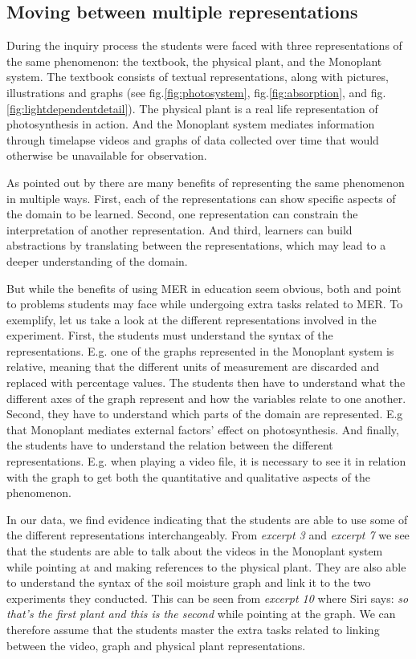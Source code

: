 \subsection{Moving between multiple representations}
During the inquiry process the students were faced with three representations of the same phenomenon: the textbook, the physical plant, and the Monoplant system. The textbook consists of textual representations, along with pictures, illustrations and graphs (see fig.\ref{fig:photosystem}, fig.\ref{fig:absorption}, and fig.\ref{fig:lightdependentdetail}). The physical plant is a real life representation of photosynthesis in action. And the Monoplant system mediates information through timelapse videos and graphs of data collected over time that would otherwise be unavailable for observation.  

As pointed out by \citet{van2006supporting} there are many benefits of representing the same phenomenon in multiple ways. First, each of the representations can show specific aspects of the domain to be learned. Second, one representation can constrain the interpretation of another representation. And third, learners can build abstractions by translating between the representations, which may lead to a deeper understanding of the domain. 

But while the benefits of using MER in education seem obvious, both \citet{ainsworth1999functions} and \citet{van2006supporting} point to problems students may face while undergoing extra tasks related to MER. To exemplify, let us take a look at the different representations involved in the experiment. First, the students must understand the syntax of the representations. E.g. one of the graphs represented in the Monoplant system is relative, meaning that the different units of measurement are discarded and replaced with percentage values. The students then have to understand what the different axes of the graph represent and how the variables relate to one another. Second, they have to understand which parts of the domain are represented. E.g that Monoplant mediates external factors' effect on photosynthesis. And finally, the students have to understand the relation between the different representations. E.g. when playing a video file, it is necessary to see it in relation with the graph to get both the quantitative and qualitative aspects of the phenomenon. 

In our data, we find evidence indicating that the students are able to use some of the different representations interchangeably. From \emph{excerpt 3} and \emph{excerpt 7} we see that the students are able to talk about the videos in the Monoplant system while pointing at and making references to the physical plant. They are also able to understand the syntax of the soil moisture graph and link it to the two experiments they conducted. This can be seen from \emph{excerpt 10} where Siri says: \emph{so that's the first plant and this is the second} while pointing at the graph. We can therefore assume that the students master the extra tasks related to linking between the video, graph and physical plant representations. 

